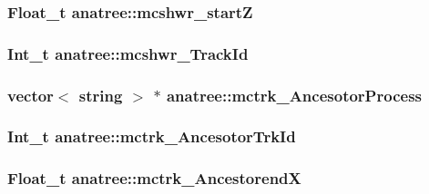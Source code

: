 \hypertarget{classanatree_a0d6ecbb9b05299434d4fbe4f3b85eaa9}{
\subsubsection[{mcshwr\-\_\-start\-Z}]{\setlength{\rightskip}{0pt plus 5cm}Float\-\_\-t anatree\-::mcshwr\-\_\-start\-Z}}\label{classanatree_a0d6ecbb9b05299434d4fbe4f3b85eaa9}
\hypertarget{classanatree_ac06ac54bed76c8f15659ce042673db42}{
\subsubsection[{mcshwr\-\_\-\-Track\-Id}]{\setlength{\rightskip}{0pt plus 5cm}Int\-\_\-t anatree\-::mcshwr\-\_\-\-Track\-Id}}\label{classanatree_ac06ac54bed76c8f15659ce042673db42}
\hypertarget{classanatree_a39f3ac00257d23e09c7d76ab850f7df5}{
\subsubsection[{mctrk\-\_\-\-Ancesotor\-Process}]{\setlength{\rightskip}{0pt plus 5cm}vector$<$ string $>$ $\ast$ anatree\-::mctrk\-\_\-\-Ancesotor\-Process}}\label{classanatree_a39f3ac00257d23e09c7d76ab850f7df5}
\hypertarget{classanatree_adcdd8a3026ca8feb1817c4438058eb47}{
\subsubsection[{mctrk\-\_\-\-Ancesotor\-Trk\-Id}]{\setlength{\rightskip}{0pt plus 5cm}Int\-\_\-t anatree\-::mctrk\-\_\-\-Ancesotor\-Trk\-Id}}\label{classanatree_adcdd8a3026ca8feb1817c4438058eb47}
\hypertarget{classanatree_ad6a37768e8fb4d82160dda13fd74f034}{
\subsubsection[{mctrk\-\_\-\-Ancestorend\-X}]{\setlength{\rightskip}{0pt plus 5cm}Float\-\_\-t anatree\-::mctrk\-\_\-\-Ancestorend\-X}}\label{classanatree_ad6a37768e8fb4d82160dda13fd74f034}
